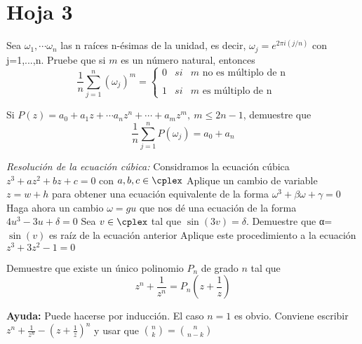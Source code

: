 \section{Hoja 3}

\begin{problem}[1]
Sea $ω_1,\cdots ω_n$ las n raíces n-ésimas de la unidad, es decir, $ω_j=e^{2πi(j/n)}$ con j=1,...,n.
\ppart Pruebe que si $m$ es un número natural, entonces
\[\frac{1}{n}\sum_{j=1}^n (ω_j)^m = \left\{ \begin{array}{lcc}
             0 &   si  & m \text{ no es múltiplo de  n} \\
             \\ 1 &  si  & m\text{ es múltiplo de n }
             \end{array}
   \right.\]

\ppart Si $P(z) = a_0+a_1z+\cdots a_nz^n+\cdots + a_mz^m, \ m \leq 2n-1$, demuestre que
\[\frac{1}{n}\sum_{j=1}^nP(ω_j)=a_0+a_n\]

\solution


\end{problem}

\begin{problem}[2]
\textit{Resolución de la ecuación cúbica:} Considramos la ecuación cúbica $z^3+az^2+bz+c=0$ con $a,b,c \in \cplex$
\ppart Aplique un cambio de variable $z=w+h$ para obtener una ecuación equivalente de la forma $ω^3+βω+γ=0$
\ppart Haga ahora un cambio $ω=gu$ que nos dé una ecuación de la forma $4u^3-3u+δ=0$
\ppart Sea $v \in \cplex$ tal que $\sin(3v)=δ$. Demuestre que α=$\sin(v)$ es raíz de la ecuación anterior
\ppart Aplique este procedimiento a la ecuación $z^3+3z^2-1=0$

\solution
\end{problem}

\begin{problem}[3]
Demuestre que existe un único polinomio $P_n$ de grado $n$ tal que
\[z^n+\frac{1}{z^n}=P_n\left( z + \frac{1}{z}\right)\]

\textbf{Ayuda:} Puede hacerse por inducción. El caso $n=1$ es obvio. Conviene escribir $z^n+\frac{1}{z^n}-\left( z+\frac{1}{z}\right)^n$ y usar que ${n \choose k} = {n \choose n-k}$
\solution
\end{problem}

